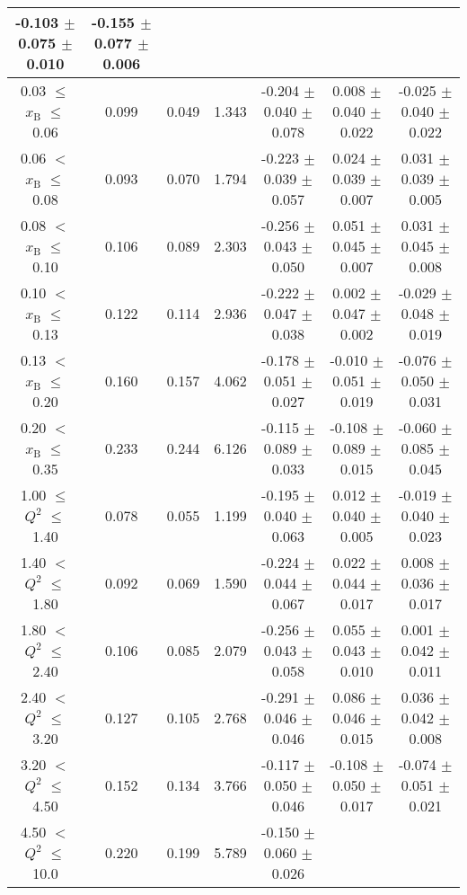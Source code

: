 \begin{table}[width=15cm]
\begin{center}
{\begin{tabular}{|c|c|c|c|c|c|c|}
-0.103  $\pm$  0.075   $\pm$  0.010 & -0.155 $\pm$   0.077  $\pm$   0.006\\
\hline
0.03 $\leqslant$ $x_{\textrm{B}}$ $\leqslant$ 0.06 &  0.099 & 0.049 & 1.343 & -0.204  $\pm$  0.040  $\pm$   0.078 &
0.008 $\pm$   0.040  $\pm$   0.022 & -0.025  $\pm$  0.040  $\pm$  0.022 \\ 
0.06 $<$ $x_{\textrm{B}}$ $\leqslant$ 0.08 &  0.093 & 0.070 &  1.794 &  -0.223 $\pm$  0.039  $\pm$   0.057 &
0.024  $\pm$  0.039  $\pm$   0.007 & 0.031 $\pm$   0.039  $\pm$   0.005\\
0.08 $<$ $x_{\textrm{B}}$ $\leqslant$ 0.10 &  0.106 & 0.089 &  2.303 &  -0.256 $\pm$   0.043  $\pm$   0.050 &
0.051 $\pm$   0.045  $\pm$   0.007 & 0.031  $\pm$  0.045  $\pm$   0.008\\
0.10 $<$ $x_{\textrm{B}}$ $\leqslant$ 0.13 &  0.122 &  0.114 &  2.936 &  -0.222 $\pm$   0.047  $\pm$   0.038 &
0.002  $\pm$  0.047 $\pm$    0.002 & -0.029 $\pm$ 0.048  $\pm$   0.019\\
0.13 $<$ $x_{\textrm{B}}$ $\leqslant$ 0.20 &  0.160 & 0.157 &  4.062 &  -0.178 $\pm$   0.051  $\pm$   0.027 &
-0.010  $\pm$  0.051 $\pm$    0.019 & -0.076 $\pm$   0.050  $\pm$   0.031\\
0.20 $<$ $x_{\textrm{B}}$ $\leqslant$ 0.35 &  0.233 & 0.244 &  6.126 &  -0.115  $\pm$  0.089 $\pm$    0.033 &
-0.108  $\pm$  0.089  $\pm$   0.015 & -0.060 $\pm$  0.085 $ \pm$  0.045\\
\hline
1.00 $\leqslant$ $Q^{2}$ $\leqslant$ 1.40 &  0.078 & 0.055  & 1.199  &  -0.195  $\pm$  0.040  $\pm$   0.063 &
0.012 $\pm$   0.040  $\pm$   0.005 & -0.019  $\pm$  0.040  $\pm$   0.023\\
1.40 $<$ $Q^{2}$ $\leqslant$ 1.80 &  0.092 & 0.069 &  1.590  &  -0.224  $\pm$  0.044  $\pm$   0.067 &
0.022 $\pm$  0.044  $\pm$   0.017 & 0.008 $\pm$   0.036  $\pm$   0.017\\
1.80 $<$ $Q^{2}$ $\leqslant$ 2.40 &  0.106 & 0.085 &  2.079  &  -0.256 $\pm$  0.043  $\pm$   0.058 &
0.055 $\pm$   0.043  $\pm$   0.010 & 0.001  $\pm$  0.042  $\pm$   0.011\\
2.40 $<$ $Q^{2}$ $\leqslant$ 3.20 &  0.127 & 0.105  & 2.768  &  -0.291  $\pm$  0.046   $\pm$  0.046 & 
0.086  $\pm$  0.046  $\pm$   0.015 & 0.036  $\pm$  0.042  $\pm$   0.008\\
3.20 $<$ $Q^{2}$ $\leqslant$ 4.50 &  0.152 & 0.134 &  3.766  &  -0.117  $\pm$  0.050  $\pm$   0.046 &
-0.108  $\pm$  0.050  $\pm$   0.017 & -0.074  $\pm$  0.051  $\pm$   0.021 \\
4.50 $<$ $Q^{2}$ $\leqslant$ 10.0 &  0.220 & 0.199 &  5.789  &  -0.150 $\pm$ 0.060  $\pm$   0.026 &

\end{tabular}}
\end{center}
\end{table}
